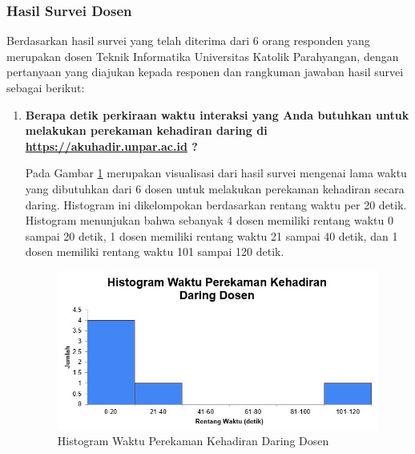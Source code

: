 \subsubsection{Hasil Survei Dosen} 
Berdasarkan hasil survei yang telah diterima dari 6 orang responden yang merupakan dosen Teknik Informatika Universitas Katolik Parahyangan, dengan pertanyaan yang diajukan kepada responen dan rangkuman jawaban hasil survei sebagai berikut:
\begin{enumerate}
	\item \textbf{Berapa detik perkiraan waktu interaksi yang Anda butuhkan untuk melakukan perekaman kehadiran daring di \url{https://akuhadir.unpar.ac.id} ?}
	
	Pada Gambar \ref{fig:DaringDosen} merupakan visualisasi dari hasil survei mengenai lama waktu yang dibutuhkan dari 6 dosen untuk melakukan perekaman kehadiran secara daring. Histogram ini dikelompokan berdasarkan rentang waktu per 20 detik. Histogram menunjukan bahwa sebanyak 4 dosen memiliki rentang waktu 0 sampai 20 detik, 1 dosen memiliki rentang waktu 21 sampai 40 detik, dan 1 dosen memiliki rentang waktu 101 sampai 120 detik. 
		\begin{figure}[H] \vspace{-0.6cm}
		\centering
		\includegraphics[scale=0.7]{Gambar/DaringDosen.jpg}
		\caption{Histogram Waktu Perekaman Kehadiran Daring Dosen} 
		\label{fig:DaringDosen}
	\end{figure}
	

\end{enumerate}
